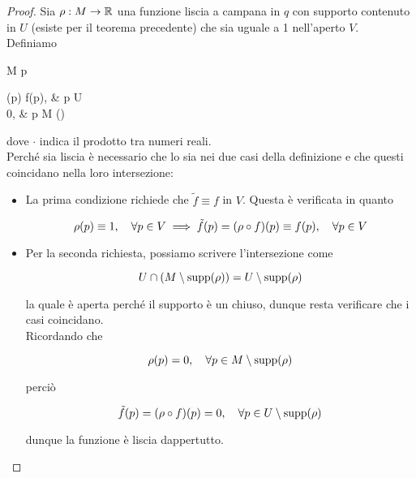 \begin{proof}
	Sia $ \rho : M \to \mathbb{R} $ una funzione liscia a campana in $ q $ con supporto contenuto in $ U $ (esiste per il teorema precedente) che sia uguale a 1 nell'aperto $ V $. \\
	Definiamo
	
		{M}{\R}
		{p}{%
			\begin{cases}
				\rho(p) \cdot f(p), & p \in U \\
				0, & p \in M \setminus \supp(\rho)
			\end{cases}
			}
	
	dove $ \cdot $ indica il prodotto tra numeri reali. \\
	Perché sia liscia è necessario che lo sia nei due casi della definizione e che questi coincidano nella loro intersezione:
	
	\begin{itemize}
		\item La prima condizione richiede che $ \tilde{f} \equiv f $ in $ V $. Questa è verificata in quanto
		
		\begin{equation}
			\rho(p) \equiv 1 \qcomma \forall p \in V \implies \tilde{f}(p) = (\rho \circ f)(p) \equiv f(p) \qcomma \forall p \in V
		\end{equation}
		
		\item Per la seconda richiesta, possiamo scrivere l'intersezione come
		
		\begin{equation}
			U \cap (M \setminus \operatorname{supp}(\rho)) = U \setminus \operatorname{supp}(\rho)
		\end{equation}
		
		la quale è aperta perché il supporto è un chiuso, dunque resta verificare che i casi coincidano. \\
		Ricordando che
		
		\begin{equation}
			\rho(p) = 0 \qcomma \forall p \in M \setminus \supp(\rho)
		\end{equation}
		
		perciò
		
		\begin{equation}
			\tilde{f}(p) = (\rho \circ f)(p) = 0 \qcomma \forall p \in U \setminus \supp(\rho)
		\end{equation}
		
		dunque la funzione è liscia dappertutto.
	\end{itemize}
\end{proof}

